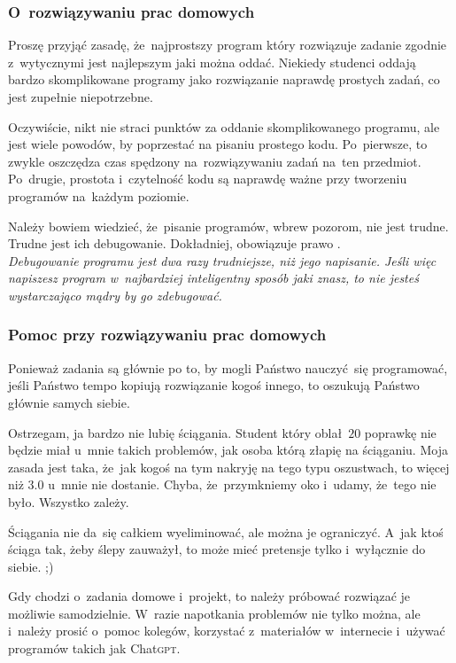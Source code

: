 \documentclass[10pt,t]{beamer}
\begin{document}
\begin{frame}
  \frametitle{O~rozwiązywaniu prac domowych}


  Proszę przyjąć zasadę, że~\alert{najprostszy program} który rozwiązuje
  zadanie zgodnie z~wytycznymi jest najlepszym jaki można oddać. Niekiedy
  studenci oddają bardzo skomplikowane programy jako rozwiązanie naprawdę
  prostych zadań, co jest zupełnie niepotrzebne.

  Oczywiście, nikt nie straci punktów za oddanie skomplikowanego programu,
  ale jest wiele powodów, by poprzestać na pisaniu prostego kodu.
  Po~pierwsze, to zwykle oszczędza czas spędzony na~rozwiązywaniu zadań
  na~ten przedmiot. Po~drugie, prostota i~czytelność kodu są naprawdę ważne
  przy tworzeniu programów na~każdym poziomie.

  Należy bowiem wiedzieć, że~pisanie programów, wbrew pozorom,
  \alert{nie} jest trudne. \alert{Trudne jest ich debugowanie.}
  Dokładniej, obowiązuje prawo
  . \\
  \textit{Debugowanie programu jest dwa razy trudniejsze, niż jego
    napisanie. Jeśli więc napiszesz program w~najbardziej inteligentny
    sposób jaki znasz, to nie jesteś wystarczająco mądry by go
    zdebugować.}

\end{frame}





\begin{frame}
  \frametitle{Pomoc przy rozwiązywaniu prac domowych}


  Ponieważ zadania są głównie po to, by mogli Państwo nauczyć~się
  programować, jeśli Państwo tempo kopiują rozwiązanie kogoś innego,
  to oszukują Państwo głównie samych siebie.

  Ostrzegam, ja bardzo \alert{nie lubię} ściągania. Student który
  oblał~$20$ poprawkę nie będzie miał u~mnie takich problemów, jak osoba
  którą złapię na ściąganiu. Moja zasada jest taka, że~jak kogoś na tym
  nakryję na tego typu oszustwach, to więcej niż $3.0$ u~mnie
  \alert{nie dostanie}. Chyba, że~przymkniemy oko i~udamy, że~tego nie było.
  Wszystko zależy.

  Ściągania nie da~się całkiem wyeliminować, ale można je ograniczyć.
  A~jak ktoś ściąga tak, żeby ślepy zauważył, to może mieć pretensje tylko
  i~wyłącznie do siebie. ;)

  Gdy chodzi o~zadania domowe i~projekt, to należy próbować rozwiązać je
  możliwie samodzielnie. W~razie napotkania problemów nie tylko można,
  ale i~\alert{należy} prosić o~pomoc kolegów, korzystać z~materiałów
  w~internecie i~używać programów takich jak Chat\textsc{gpt}.

\end{frame}
\end{document}
